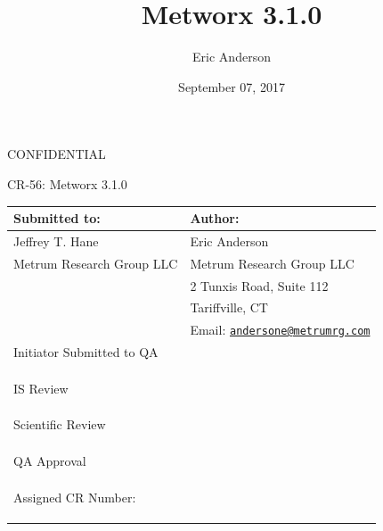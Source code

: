\documentclass[]{article}
\title{Metworx 3.1.0}
\author{Eric Anderson}
\date{September 07, 2017}
\begin{document}
\setlength{\parindent}{0pt}


\vspace*{1cm}
\begin{center}
{\large CONFIDENTIAL}


\vspace*{1cm}


\vspace*{1cm}

{\huge CR-56: Metworx 3.1.0}
\vspace{3.0cm}

\begin{tabular}{|p{7cm}|p{7cm}|}\hline
Submitted to: & Author:\\\hline
Jeffrey T. Hane & Eric Anderson \\
Metrum Research Group LLC & Metrum Research Group LLC\\
  & 2 Tunxis Road, Suite 112\\
  & Tariffville, CT\\
  & Email: \href{mailto:andersone@metrumrg.com}{\nolinkurl{andersone@metrumrg.com}}  \\\hline

  Initiator Submitted to QA   & \\

  & \\
  & \\
  & \\\hline

  IS Review   & \\

  & \\
  & \\
  & \\\hline
  
  Scientific Review   & \\

  & \\
  & \\
  & \\\hline


QA Approval  & \\

 & \\
 & \\
 & \\\hline

 Assigned CR Number: & \\

 & \\
 & \\
 & \\\hline


\end{tabular}

\end{center}
\end{document}
